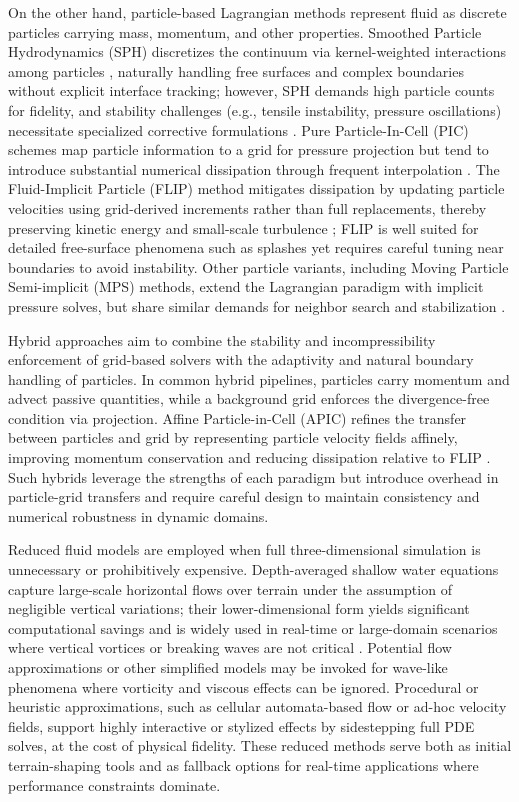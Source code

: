 On the other hand, particle-based Lagrangian methods represent fluid as discrete particles carrying mass, momentum, and other properties. Smoothed Particle Hydrodynamics (SPH) discretizes the continuum via kernel-weighted interactions among particles \cite{Monaghan2005}, naturally handling free surfaces and complex boundaries without explicit interface tracking; however, SPH demands high particle counts for fidelity, and stability challenges (e.g., tensile instability, pressure oscillations) necessitate specialized corrective formulations \cite{Monaghan2005,Koschier2022}. Pure Particle-In-Cell (PIC) schemes map particle information to a grid for pressure projection but tend to introduce substantial numerical dissipation through frequent interpolation \cite{Harlow1962}. The Fluid-Implicit Particle (FLIP) method mitigates dissipation by updating particle velocities using grid-derived increments rather than full replacements, thereby preserving kinetic energy and small-scale turbulence \cite{Brackbill1988}; FLIP is well suited for detailed free-surface phenomena such as splashes yet requires careful tuning near boundaries to avoid instability. Other particle variants, including Moving Particle Semi-implicit (MPS) methods, extend the Lagrangian paradigm with implicit pressure solves, but share similar demands for neighbor search and stabilization \cite{Koshizuka1996}.

Hybrid approaches aim to combine the stability and incompressibility enforcement of grid-based solvers with the adaptivity and natural boundary handling of particles. In common hybrid pipelines, particles carry momentum and advect passive quantities, while a background grid enforces the divergence-free condition via projection. Affine Particle-in-Cell (APIC) refines the transfer between particles and grid by representing particle velocity fields affinely, improving momentum conservation and reducing dissipation relative to FLIP \cite{Jiang2015}. Such hybrids leverage the strengths of each paradigm but introduce overhead in particle-grid transfers and require careful design to maintain consistency and numerical robustness in dynamic domains.

Reduced fluid models are employed when full three-dimensional simulation is unnecessary or prohibitively expensive. Depth-averaged shallow water equations capture large-scale horizontal flows over terrain under the assumption of negligible vertical variations; their lower-dimensional form yields significant computational savings and is widely used in real-time or large-domain scenarios where vertical vortices or breaking waves are not critical \cite{Vreugdenhil1994,Pan2012}. Potential flow approximations or other simplified models may be invoked for wave-like phenomena where vorticity and viscous effects can be ignored. Procedural or heuristic approximations, such as cellular automata-based flow or ad-hoc velocity fields, support highly interactive or stylized effects by sidestepping full PDE solves, at the cost of physical fidelity. These reduced methods serve both as initial terrain-shaping tools and as fallback options for real-time applications where performance constraints dominate.


